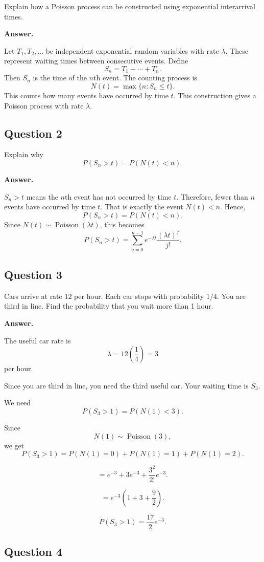\documentclass[12pt]{article}
\begin{document}
Explain how a Poisson process can be constructed using exponential interarrival times.

\textbf{Answer.}

Let \(T_1,T_2,\ldots\) be independent exponential random variables with rate \(\lambda\). These represent waiting times between consecutive events. Define
\[
S_n=T_1+\cdots+T_n.
\]
Then \(S_n\) is the time of the \(n\)th event. The counting process is
\[
N(t)=\max\{n:S_n\leq t\}.
\]
This counts how many events have occurred by time \(t\). This construction gives a Poisson process with rate \(\lambda\).

\subsection*{Question 2}

Explain why
\[
P(S_n>t)=P(N(t)<n).
\]

\textbf{Answer.}

\(S_n>t\) means the \(n\)th event has not occurred by time \(t\). Therefore, fewer than \(n\) events have occurred by time \(t\). That is exactly the event \(N(t)<n\). Hence,
\[
P(S_n>t)=P(N(t)<n).
\]
Since \(N(t)\sim\operatorname{Poisson}(\lambda t)\), this becomes
\[
P(S_n>t)=\sum_{j=0}^{n-1}e^{-\lambda t}\frac{(\lambda t)^j}{j!}.
\]

\subsection*{Question 3}

Cars arrive at rate 12 per hour. Each car stops with probability \(1/4\). You are third in line. Find the probability that you wait more than 1 hour.

\textbf{Answer.}

The useful car rate is
\[
\lambda=12\left(\frac14\right)=3
\]
per hour.

Since you are third in line, you need the third useful car. Your waiting time is \(S_3\).

We need
\[
P(S_3>1)=P(N(1)<3).
\]

Since
\[
N(1)\sim\operatorname{Poisson}(3),
\]
we get
\[
P(S_3>1)=P(N(1)=0)+P(N(1)=1)+P(N(1)=2).
\]

\[
=e^{-3}+3e^{-3}+\frac{3^2}{2!}e^{-3}.
\]

\[
=e^{-3}\left(1+3+\frac92\right).
\]

\[
\boxed{
P(S_3>1)=\frac{17}{2}e^{-3}.
}
\]

\subsection*{Question 4}
\end{document}
